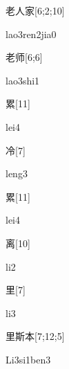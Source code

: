 \begin{verbete}{老人家}[6;2;10]
\begin{pronuncia}{lao3ren2jia0}
\end{pronuncia}
\end{verbete}

\begin{verbete}{老师}[6;6]
\begin{pronuncia}{lao3shi1}
\end{pronuncia}
\end{verbete}

\begin{verbete}[lei4]{累}[11]
\begin{pronuncia}{lei4}
\end{pronuncia}
\end{verbete}

\begin{verbete}[leng3]{冷}[7]
\begin{pronuncia}{leng3}
\end{pronuncia}
\end{verbete}

\begin{verbete}[lei4]{累}[11]
\begin{pronuncia}{lei4}
\end{pronuncia}
\end{verbete}

\begin{verbete}[li2]{离}[10]
\begin{pronuncia}{li2}
\end{pronuncia}
\end{verbete}

\begin{verbete}[li3]{里}[7]
\begin{pronuncia}{li3}
\end{pronuncia}
\end{verbete}

\begin{verbete}[Li3si1ben3]{里斯本}[7;12;5]
\begin{pronuncia}{Li3si1ben3}
\end{pronuncia}
\end{verbete}


